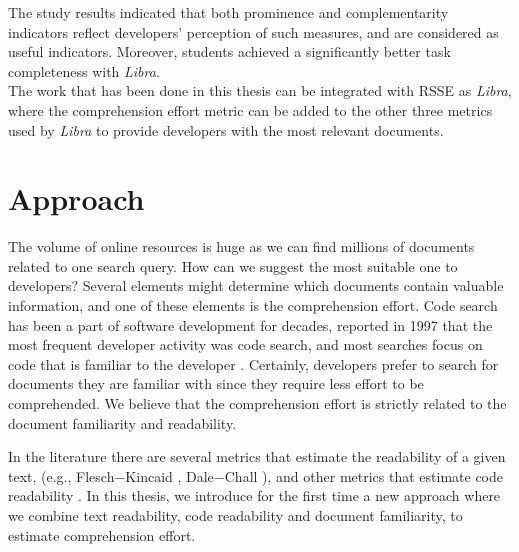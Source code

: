 \documentclass[12pt,mscthesis]{usiinfthesis}
\begin{document}
	The study results indicated that both prominence and complementarity indicators reflect developers’ perception of such measures, and are considered as useful indicators. Moreover, students  achieved a significantly better task completeness with \emph{Libra}.\\

	The work that has been done in this thesis can be integrated with RSSE as \emph{Libra}, where the comprehension effort metric can be added to the other three metrics used by \emph{Libra} to provide developers with the most relevant documents.


\chapter{Approach}
	The volume of online resources is huge as we can find millions of documents related to one search query. How can we suggest the most suitable one to developers? Several elements might determine which documents contain valuable information, and one of these elements is the comprehension effort. Code search has been a part of software development for decades, \citet{Singer-1997} reported in 1997 that the most frequent developer activity was code search, and most searches focus on code that is familiar to the developer \cite{Sadowski:2015}. Certainly, developers prefer to search for documents they are familiar with since they require less effort to be comprehended. We believe that the comprehension effort is strictly related to the document familiarity and readability.
     
    In the literature there are several metrics that estimate the readability of a given text, (e.g., Flesch$-$Kincaid \cite{Kincaid}, Dale$-$Chall \cite{Dale-Chall}), and other metrics that estimate code readability \cite{Buse:2010:LMC:1850489.1850615}. In this thesis, we introduce for the first time a new approach where we combine text readability, code readability and document familiarity, to estimate comprehension effort.\\

	
	
\end{document}
